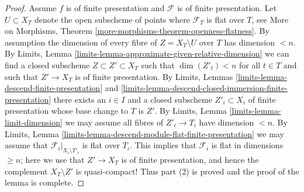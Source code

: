 \begin{proof}
\medskip\noindent
Assume $f$ is of finite presentation and $\mathcal{F}$ is of finite
presentation. Let $U \subset X_T$ denote the open subscheme of points where
$\mathcal{F}_T$ is flat over $T$, see
More on Morphisms, Theorem \ref{more-morphisms-theorem-openness-flatness}.
By assumption the dimension of every fibre of $Z = X_T \setminus U$ over
$T$ has dimension $< n$. By
Limits, Lemma \ref{limits-lemma-approximate-given-relative-dimension}
we can find a closed subscheme $Z \subset Z' \subset X_T$
such that $\dim(Z'_t) < n$ for all $t \in T$ and such that
$Z' \to X_T$ is of finite presentation. By
Limits, Lemmas \ref{limits-lemma-descend-finite-presentation} and
\ref{limits-lemma-descend-closed-immersion-finite-presentation}
there exists an $i \in I$ and a closed subscheme $Z'_i \subset X_i$
of finite presentation whose base change to $T$ is $Z'$. By
Limits, Lemma \ref{limits-lemma-limit-dimension}
we may assume all fibres of $Z'_i \to T_i$ have dimension $< n$. By
Limits, Lemma \ref{limits-lemma-descend-module-flat-finite-presentation}
we may assume that $\mathcal{F}_i|_{X_i \setminus T'_i}$
is flat over $T_i$. This implies that $\mathcal{F}_i$ is
flat in dimensions $\geq n$; here we use that $Z' \to X_T$ is of finite
presentation, and hence the complement $X_T \setminus Z'$ is quasi-compact!
Thus part (2) is proved and the proof of the lemma is complete.
\end{proof}
